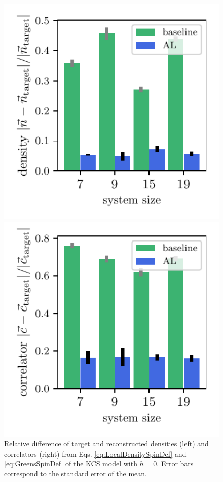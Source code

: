 \documentclass[pra,aps,showpacs,groupedaddress,superscriptaddress,twocolumn,toc=flat,biblatex,footinbib]{revtex4-1}
\begin{document}
\begin{figure}[t]
	\centering
\begin{minipage}[t]{0.23\textwidth}
   \includegraphics[width=1\textwidth]{Paper/Graphics/LGT_different_threshold_density_difference.pdf}
\end{minipage}
\begin{minipage}[t]{0.23\textwidth}
   \includegraphics[width=1\textwidth]{Paper/Graphics/LGT_different_threshold_correlator_difference.pdf}
\end{minipage}
	\caption[]{Relative difference of target and reconstructed densities (left) and correlators (right) from Eqs. \eqref{eq:LocalDensitySpinDef} and \eqref{eq:GreensSpinDef} of the KCS model with $h=0$. Error bars correspond to the standard error of the mean.}
	\label{fig:LGT_h=0}
\end{figure}
\end{document}
